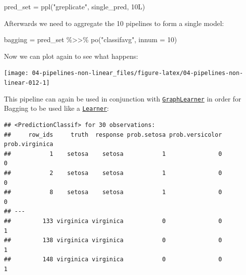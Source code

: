 \documentclass[
]{scrbook}
\newenvironment{Shaded}{\begin{snugshade}}{\end{snugshade}}
\newcommand{\AttributeTok}[1]{\textcolor[rgb]{0.77,0.63,0.00}{#1}}
\newcommand{\ConstantTok}[1]{\textcolor[rgb]{0.00,0.00,0.00}{#1}}
\newcommand{\DecValTok}[1]{\textcolor[rgb]{0.00,0.00,0.81}{#1}}
\newcommand{\FunctionTok}[1]{\textcolor[rgb]{0.00,0.00,0.00}{#1}}
\newcommand{\NormalTok}[1]{#1}
\newcommand{\OtherTok}[1]{\textcolor[rgb]{0.56,0.35,0.01}{#1}}
\newcommand{\SpecialCharTok}[1]{\textcolor[rgb]{0.00,0.00,0.00}{#1}}
\newcommand{\StringTok}[1]{\textcolor[rgb]{0.31,0.60,0.02}{#1}}
\renewenvironment{Shaded} {\begin{snugshade}\small} {\end{snugshade}}
\begin{document}
\begin{Shaded}
\begin{Highlighting}[]
\NormalTok{pred\_set }\OtherTok{=} \FunctionTok{ppl}\NormalTok{(}\StringTok{"greplicate"}\NormalTok{, single\_pred, 10L)}
\end{Highlighting}
\end{Shaded}

Afterwards we need to aggregate the 10 pipelines to form a single model:

\begin{Shaded}
\begin{Highlighting}[]
\NormalTok{bagging }\OtherTok{=}\NormalTok{ pred\_set }\SpecialCharTok{\%\textgreater{}\textgreater{}\%}
  \FunctionTok{po}\NormalTok{(}\StringTok{"classifavg"}\NormalTok{, }\AttributeTok{innum =} \DecValTok{10}\NormalTok{)}
\end{Highlighting}
\end{Shaded}

Now we can plot again to see what happens:

\begin{Shaded}
\end{Shaded}

\begin{center}\texttt{[image: 04-pipelines-non-linear\_files/figure-latex/04-pipelines-non-linear-012-1]} \end{center}

This pipeline can again be used in conjunction with \href{https://mlr3pipelines.mlr-org.com/reference/mlr_learners_graph.html}{\texttt{GraphLearner}} in order for Bagging to be used like a \href{https://mlr3.mlr-org.com/reference/Learner.html}{\texttt{Learner}}:

\begin{Shaded}
\end{Shaded}

\begin{verbatim}
## <PredictionClassif> for 30 observations:
##     row_ids     truth  response prob.setosa prob.versicolor prob.virginica
##           1    setosa    setosa           1               0              0
##           2    setosa    setosa           1               0              0
##           8    setosa    setosa           1               0              0
## ---                                                                       
##         133 virginica virginica           0               0              1
##         138 virginica virginica           0               0              1
##         148 virginica virginica           0               0              1
\end{verbatim}
\end{document}
